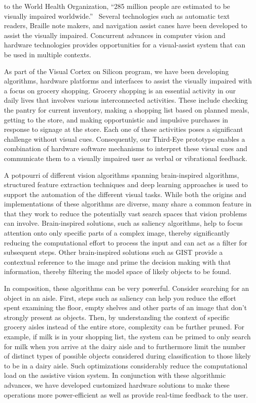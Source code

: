 to the World Health Organization, ``285 million people are estimated
to be visually impaired worldwide.''~\cite{WHOvisuallyimpaired}
Several technologies such as automatic text readers, Braille note
makers, and navigation assist canes have been developed to assist the
visually impaired. Concurrent advances in computer vision and hardware
technologies provides opportunities for a visual-assist system that
can be used in multiple contexts.

As part of the Visual Cortex on Silicon program, we have been
developing algorithms, hardware platforms and interfaces to assist the
visually impaired with a focus on grocery shopping. Grocery shopping
is an essential activity in our daily lives that involves various
interconnected activities. These include checking the pantry for
current inventory, making a shopping list based on planned meals,
getting to the store, and making opportunistic and impulsive purchases
in response to signage at the store. Each one of these activities
poses a significant challenge without visual cues.  Consequently, our
Third-Eye prototype enables a combination of hardware software
mechanisms to interpret these visual cues and communicate them to a
visually impaired user as verbal or vibrational feedback.

A potpourri of different vision algorithms spanning brain-inspired
algorithms, structured feature extraction techniques and deep learning
approaches is used to support the automation of the different visual
tasks. While both the origins and implementations of these algorithms
are diverse, many share a common feature in that they work to reduce
the potentially vast search spaces that vision problems can
involve. Brain-inspired solutions, such as saliency algorithms, help
to focus attention onto only specific parts of a complex image,
thereby significantly reducing the computational effort to process the
input and can act as a filter for subsequent steps.  Other
brain-inspired solutions such as GIST provide a contextual reference
to the image and prime the decision making with that information,
thereby filtering the model space of likely objects to be found.

In composition, these algorithms can be very powerful. Consider
searching for an object in an aisle. First, steps such as saliency can
help you reduce the effort spent examining the floor, empty shelves
and other parts of an image that don't strongly present as
objects. Then, by understanding the context of specific grocery aisles
instead of the entire store, complexity can be further pruned.  For
example, if milk is in your shopping list, the system can be primed to
only search for milk when you arrive at the dairy aisle and to
furthermore limit the number of distinct types of possible objects
considered during classification to those likely to be in a dairy
aisle. Such optimizations considerably reduce the computational load
on the assistive vision system. In conjunction with these algorithmic
advances, we have developed customized hardware solutions to make
these operations more power-efficient as well as provide real-time
feedback to the user.

